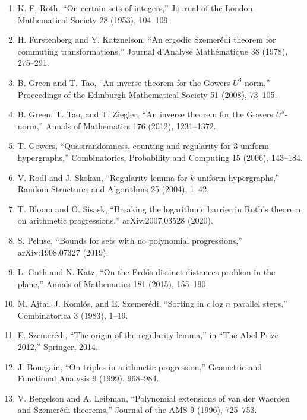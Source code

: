 \begin{enumerate}
\item K. F. Roth, ``On certain sets of integers,'' Journal of the London Mathematical Society 28 (1953), 104--109.
\item H. Furstenberg and Y. Katznelson, ``An ergodic Szemer\'edi theorem for commuting transformations,'' Journal d'Analyse Math\'ematique 38 (1978), 275--291.
\item B. Green and T. Tao, ``An inverse theorem for the Gowers $U^3$-norm,'' Proceedings of the Edinburgh Mathematical Society 51 (2008), 73--105.
\item B. Green, T. Tao, and T. Ziegler, ``An inverse theorem for the Gowers $U^s$-norm,'' Annals of Mathematics 176 (2012), 1231--1372.
\item T. Gowers, ``Quasirandomness, counting and regularity for 3-uniform hypergraphs,'' Combinatorics, Probability and Computing 15 (2006), 143--184.
\item V. Rodl and J. Skokan, ``Regularity lemma for $k$-uniform hypergraphs,'' Random Structures and Algorithms 25 (2004), 1--42.
\item T. Bloom and O. Sisask, ``Breaking the logarithmic barrier in Roth's theorem on arithmetic progressions,'' arXiv:2007.03528 (2020).
\item S. Peluse, ``Bounds for sets with no polynomial progressions,'' arXiv:1908.07327 (2019).
\item L. Guth and N. Katz, ``On the Erd\H{o}s distinct distances problem in the plane,'' Annals of Mathematics 181 (2015), 155--190.
\item M. Ajtai, J. Koml\'os, and E. Szemer\'edi, ``Sorting in $c \log n$ parallel steps,'' Combinatorica 3 (1983), 1--19.
\item E. Szemer\'edi, ``The origin of the regularity lemma,'' in ``The Abel Prize 2012,'' Springer, 2014.
\item J. Bourgain, ``On triples in arithmetic progression,'' Geometric and Functional Analysis 9 (1999), 968--984.
\item V. Bergelson and A. Leibman, ``Polynomial extensions of van der Waerden and Szemer\'edi theorems,'' Journal of the AMS 9 (1996), 725--753.
\end{enumerate}
